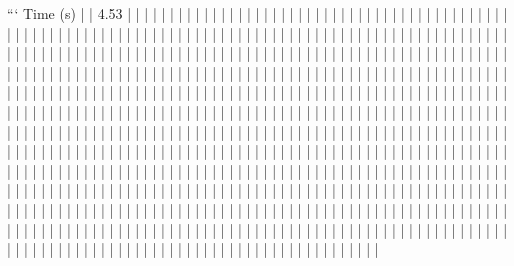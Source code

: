 ```
Time (s)
|
|  4.53
|    |
|    |
|    |
|    |
|    |
|    |
|    |
|    |
|    |
|    |
|    |
|    |
|    |
|    |
|    |
|    |
|    |
|    |
|    |
|    |
|    |
|    |
|    |
|    |
|    |
|    |
|    |
|    |
|    |
|    |
|    |
|    |
|    |
|    |
|    |
|    |
|    |
|    |
|    |
|    |
|    |
|    |
|    |
|    |
|    |
|    |
|    |
|    |
|    |
|    |
|    |
|    |
|    |
|    |
|    |
|    |
|    |
|    |
|    |
|    |
|    |
|    |
|    |
|    |
|    |
|    |
|    |
|    |
|    |
|    |
|    |
|    |
|    |
|    |
|    |
|    |
|    |
|    |
|    |
|    |
|    |
|    |
|    |
|    |
|    |
|    |
|    |
|    |
|    |
|    |
|    |
|    |
|    |
|    |
|    |
|    |
|    |
|    |
|    |
|    |
|    |
|    |
|    |
|    |
|    |
|    |
|    |
|    |
|    |
|    |
|    |
|    |
|    |
|    |
|    |
|    |
|    |
|    |
|    |
|    |
|    |
|    |
|    |
|    |
|    |
|    |
|    |
|    |
|    |
|    |
|    |
|    |
|    |
|    |
|    |
|    |
|    |
|    |
|    |
|    |
|    |
|    |
|    |
|    |
|    |
|    |
|    |
|    |
|    |
|    |
|    |
|    |
|    |
|    |
|    |
|    |
|    |
|    |
|    |
|    |
|    |
|    |
|    |
|    |
|    |
|    |
|    |
|    |
|    |
|    |
|    |
|    |
|    |
|    |
|    |
|    |
|    |
|    |
|    |
|    |
|    |
|    |
|    |
|    |
|    |
|    |
|    |
|    |
|    |
|    |
|    |
|    |
|    |
|    |
|    |
|    |
|    |
|    |
|    |
|    |
|    |
|    |
|    |
|    |
|    |
|    |
|    |
|    |
|    |
|    |
|    |
|    |
|    |
|    |
|    |
|    |
|    |
|    |
|    |
|    |
|    |
|    |
|    |
|    |
|    |
|    |
|    |
|    |
|    |
|    |
|    |
|    |
|    |
|    |
|    |
|    |
|    |
|    |
|    |
|    |
|    |
|    |
|    |
|    |
|    |
|    |
|    |
|    |
|    |
|    |
|    |
|    |
|    |
|    |
|    |
|    |
|    |
|    |
|    |
|    |
|    |
|    |
|    |
|    |
|    |
|    |
|    |
|    |
|    |
|    |
|    |
|    |
|    |
|    |
|    |
|    |
|    |
|    |
|    |
|    |
|    |
|    |
|    |
|    |
|    |
|    |
|    |
|    |
|    |
|    |
|    |
|    |
|    |
|    |
|    |
|    |
|    |
|    |
|    |
|    |
|    |
|    |
|    |
|    |
|    |
|    |
|    |
|    |
|    |
|    |
|    |
|    |
|    |
|    |
|    |
|    |
|    |
|    |
|    |
|    |
|    |
|    |
|    |
|    |
|    |
|    |
|    |
|    |
|    |
|    |
|    |
|    |
|    |
|    |
|    |
|    |
|    |
|    |
|    |
|    |
|    |
|    |
|    |
|    |
|    |
|    |
|    |
|    |
|    |
|    |
|    |
|    |
|    |
|    |
|    |
|    |
|    |
|    |
|    |
|    |
|    |
|    |
|    |
|    |
|    |
|    |
|    |
|    |
|    |

